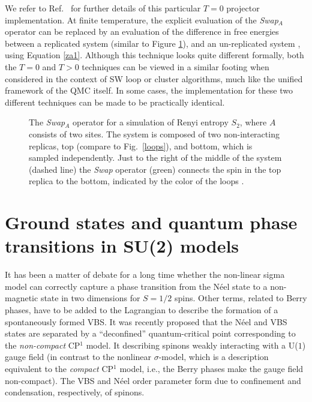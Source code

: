 \documentclass[range]{ar2e}
\begin{document}
We refer to Ref.~\cite{Kallin11} for further details of this particular $T=0$ projector implementation.  At finite temperature, the explicit evaluation of the {\it Swap}$_A$ operator can be replaced by an evaluation of the difference in free energies between a replicated system (similar to Figure \ref{swap}), and an un-replicated system \cite{Melko10}, using Equation \ref{za1}.  Although this technique looks quite different formally, both the $T=0$ and $T>0$ techniques can be viewed in a similar footing when considered in the context of SW loop or cluster algorithms, much like the unified framework of the QMC itself.  In some cases, the implementation for these two different techniques can be made to be practically identical.  

\begin{figure}
\centerline{}
\caption{The {\it Swap}$_A$ operator for a simulation of Renyi entropy $S_2$, where $A$ consists of two sites.  The system is composed of two non-interacting replicas, top (compare to Fig.~\ref{loops}), and bottom, which is sampled independently.  Just to the right of the middle of the system (dashed line) the {\it Swap} operator (green) connects the spin in the top replica to the bottom, indicated by the color of the loops \cite{Kallin11}.  
}
\label{swap}
\end{figure}

\section{Ground states and quantum phase transitions in SU(2) models}
\label{sec:su2models}

It has been a matter of debate for a long time whether the non-linear sigma model can correctly capture a phase transition from the N\'eel state 
to a non-magnetic state in two dimensions for $S=1/2$ spins. Other terms, related to Berry phases, have to be added to the Lagrangian to describe the 
formation of a spontaneously formed VBS. It was recently proposed that the N\'eel and VBS states are separated by a ``deconfined'' quantum-critical 
point \cite{Senthil04a} corresponding to the {\it non-compact} CP$^1$ model. It  describing spinons weakly interacting with a U($1$) gauge field (in contrast 
to the nonlinear $\sigma$-model, which is a description equivalent to the {\it compact} CP$^1$ model, i.e., the Berry phases make the gauge field non-compact). 
The VBS and N\'eel order parameter form due to confinement and condensation, respectively, of spinons. 
\end{document}
